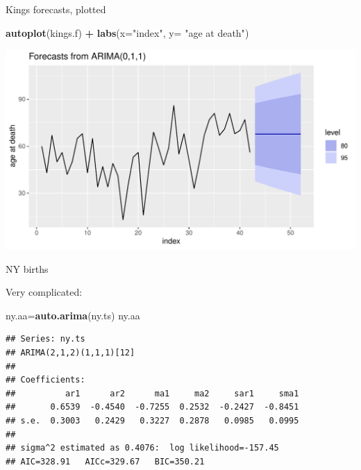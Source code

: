 \documentclass[ignorenonframetext,]{beamer}
\newenvironment{Shaded}{\begin{snugshade}}{\end{snugshade}}
\newcommand{\DataTypeTok}[1]{\textcolor[rgb]{0.13,0.29,0.53}{#1}}
\newcommand{\KeywordTok}[1]{\textcolor[rgb]{0.13,0.29,0.53}{\textbf{#1}}}
\newcommand{\NormalTok}[1]{#1}
\newcommand{\OperatorTok}[1]{\textcolor[rgb]{0.81,0.36,0.00}{\textbf{#1}}}
\newcommand{\StringTok}[1]{\textcolor[rgb]{0.31,0.60,0.02}{#1}}
\begin{document}
\begin{frame}[fragile]{Kings forecasts, plotted}
\protect\hypertarget{kings-forecasts-plotted}{}

\begin{Shaded}
\begin{Highlighting}[]
\KeywordTok{autoplot}\NormalTok{(kings.f) }\OperatorTok{+}\StringTok{ }\KeywordTok{labs}\NormalTok{(}\DataTypeTok{x=}\StringTok{"index"}\NormalTok{, }\DataTypeTok{y=} \StringTok{"age at death"}\NormalTok{)}
\end{Highlighting}
\end{Shaded}

\includegraphics{figure/unnamed-chunk-620-1.pdf}

\end{frame}

\begin{frame}[fragile]{NY births}
\protect\hypertarget{ny-births}{}

Very complicated:

\small

\begin{Shaded}
\begin{Highlighting}[]
\NormalTok{ny.aa=}\KeywordTok{auto.arima}\NormalTok{(ny.ts)}
\NormalTok{ny.aa}
\end{Highlighting}
\end{Shaded}

\begin{verbatim}
## Series: ny.ts 
## ARIMA(2,1,2)(1,1,1)[12] 
## 
## Coefficients:
##          ar1      ar2      ma1     ma2     sar1     sma1
##       0.6539  -0.4540  -0.7255  0.2532  -0.2427  -0.8451
## s.e.  0.3003   0.2429   0.3227  0.2878   0.0985   0.0995
## 
## sigma^2 estimated as 0.4076:  log likelihood=-157.45
## AIC=328.91   AICc=329.67   BIC=350.21
\end{verbatim}

\normalsize

\end{frame}
\end{document}
